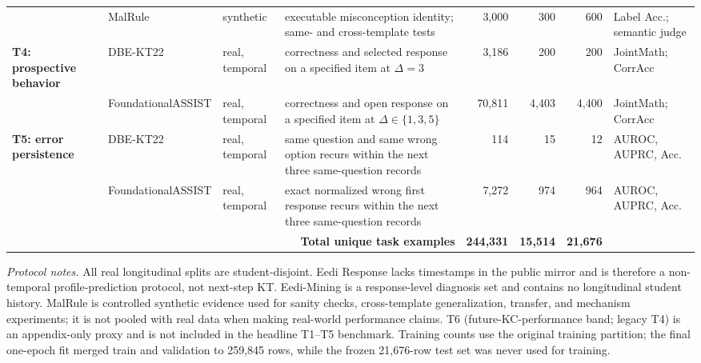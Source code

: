 \begin{table}[t]
{\begin{tabular}{@{}lllp{4.0cm}rrrl@{}}
 & MalRule & synthetic & executable misconception identity; same- and cross-template tests & 3,000 & 300 & 600 & Label Acc.; semantic judge \\
\addlinespace
\textbf{T4: prospective behavior}
 & DBE-KT22 & real, temporal & correctness and selected response on a specified item at $\Delta=3$ & 3,186 & 200 & 200 & JointMath; CorrAcc \\
 & FoundationalASSIST & real, temporal & correctness and open response on a specified item at $\Delta\in\{1,3,5\}$ & 70,811 & 4,403 & 4,400 & JointMath; CorrAcc \\
\addlinespace
\textbf{T5: error persistence}
 & DBE-KT22 & real, temporal & same question and same wrong option recurs within the next three same-question records & 114 & 15 & 12 & AUROC, AUPRC, Acc. \\
 & FoundationalASSIST & real, temporal & exact normalized wrong first response recurs within the next three same-question records & 7,272 & 974 & 964 & AUROC, AUPRC, Acc. \\
\midrule
\multicolumn{4}{r}{\textbf{Total unique task examples}} & \textbf{244,331} & \textbf{15,514} & \textbf{21,676} & \\
\bottomrule
\end{tabular}%
}
\vspace{2pt}
\begin{minipage}{0.99\textwidth}\footnotesize
\textit{Protocol notes.} All real longitudinal splits are student-disjoint.
Eedi Response lacks timestamps in the public mirror and is therefore a
non-temporal profile-prediction protocol, not next-step KT. Eedi-Mining is a
response-level diagnosis set and contains no longitudinal student history.
MalRule is controlled synthetic evidence used for sanity checks,
cross-template generalization, transfer, and mechanism experiments; it is not
pooled with real data when making real-world performance claims. T6
(future-KC-performance band; legacy T4) is an appendix-only proxy and is not
included in the headline T1--T5 benchmark. Training counts use the original
training partition; the final one-epoch fit merged train and validation to
259,845 rows, while the frozen 21,676-row test set was never used for training.
\end{minipage}
\end{table}

